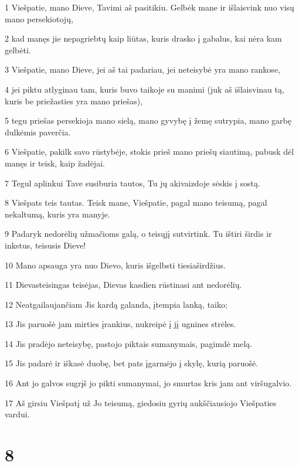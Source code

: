 \par 1 Viešpatie, mano Dieve, Tavimi aš pasitikiu. Gelbėk mane ir išlaisvink nuo visų mano persekiotojų, 
\par 2 kad manęs jie nepagriebtų kaip liūtas, kuris drasko į gabalus, kai nėra kam gelbėti. 
\par 3 Viešpatie, mano Dieve, jei aš tai padariau, jei neteisybė yra mano rankose, 
\par 4 jei piktu atlyginau tam, kuris buvo taikoje su manimi (juk aš išlaisvinau tą, kuris be priežasties yra mano priešas), 
\par 5 tegu priešas persekioja mano sielą, mano gyvybę į žemę sutrypia, mano garbę dulkėmis paverčia. 
\par 6 Viešpatie, pakilk savo rūstybėje, stokis prieš mano priešų siautimą, pabusk dėl manęs ir teisk, kaip žadėjai. 
\par 7 Tegul aplinkui Tave susiburia tautos, Tu jų akivaizdoje sėskis į sostą. 
\par 8 Viešpats teis tautas. Teisk mane, Viešpatie, pagal mano teisumą, pagal nekaltumą, kuris yra manyje. 
\par 9 Padaryk nedorėlių užmačioms galą, o teisųjį sutvirtink. Tu ištiri širdis ir inkstus, teisusis Dieve! 
\par 10 Mano apsauga yra nuo Dievo, kuris išgelbsti tiesiaširdžius. 
\par 11 Dievas­teisingas teisėjas, Dievas kasdien rūstinasi ant nedorėlių. 
\par 12 Neatgailaujančiam Jis kardą galanda, įtempia lanką, taiko; 
\par 13 Jis paruošė jam mirties įrankius, nukreipė į jį ugnines strėles. 
\par 14 Jis pradėjo neteisybę, pastojo piktais sumanymais, pagimdė melą. 
\par 15 Jis padarė ir iškasė duobę, bet pats įgarmėjo į skylę, kurią paruošė. 
\par 16 Ant jo galvos sugrįš jo pikti sumanymai, jo smurtas kris jam ant viršugalvio. 
\par 17 Aš girsiu Viešpatį už Jo teisumą, giedosiu gyrių aukščiausiojo Viešpaties vardui.



\chapter{8}


